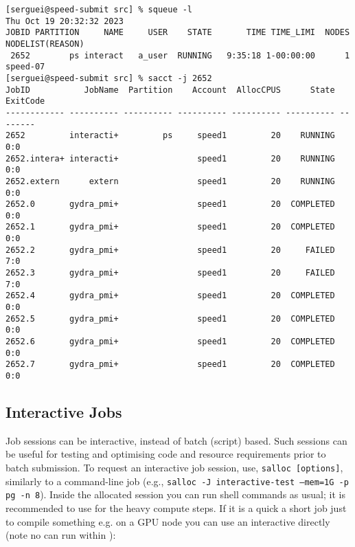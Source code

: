 \small
\begin{verbatim}
[serguei@speed-submit src] % squeue -l
Thu Oct 19 20:32:32 2023
JOBID PARTITION     NAME     USER    STATE       TIME TIME_LIMI  NODES NODELIST(REASON)
 2652        ps interact   a_user  RUNNING   9:35:18 1-00:00:00      1 speed-07
[serguei@speed-submit src] % sacct -j 2652
JobID           JobName  Partition    Account  AllocCPUS      State ExitCode
------------ ---------- ---------- ---------- ---------- ---------- --------
2652         interacti+         ps     speed1         20    RUNNING      0:0
2652.intera+ interacti+                speed1         20    RUNNING      0:0
2652.extern      extern                speed1         20    RUNNING      0:0
2652.0       gydra_pmi+                speed1         20  COMPLETED      0:0
2652.1       gydra_pmi+                speed1         20  COMPLETED      0:0
2652.2       gydra_pmi+                speed1         20     FAILED      7:0
2652.3       gydra_pmi+                speed1         20     FAILED      7:0
2652.4       gydra_pmi+                speed1         20  COMPLETED      0:0
2652.5       gydra_pmi+                speed1         20  COMPLETED      0:0
2652.6       gydra_pmi+                speed1         20  COMPLETED      0:0
2652.7       gydra_pmi+                speed1         20  COMPLETED      0:0
\end{verbatim}
\normalsize

\subsection{Interactive Jobs}
\label{sect:interactive-jobs}

Job sessions can be interactive, instead of batch (script) based. Such 
sessions can be useful for testing and optimising code and resource 
requirements prior to batch submission. To request an interactive job 
session, use, \texttt{salloc [options]}, similarly to a 
 command-line job (e.g., \texttt{salloc -J interactive-test --mem=1G -p pg -n 8}).
%
%
Inside the allocated  session you can run shell
commands as usual; it is recommended to use  for
the heavy compute steps.
%
If it is a quick a short job just to compile something e.g. on
a GPU node you can use an interactive  directly
(note no  can run within ):

